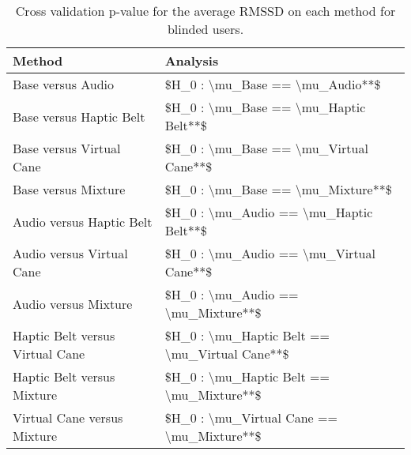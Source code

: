 
\begin{table}[!htb]
\centering
\caption{Cross validation p-value for the average RMSSD on each method for blinded users.}
\label{tab:lsd_average_RMSSD}
\begin{tabular}{ll}
\toprule
                         Method &                                      Analysis \\
\midrule
              Base versus Audio &               \$H\_0 : \textbackslash mu\_Base == \textbackslash mu\_Audio**\$ \\
        Base versus Haptic Belt &         \$H\_0 : \textbackslash mu\_Base == \textbackslash mu\_Haptic Belt**\$ \\
       Base versus Virtual Cane &        \$H\_0 : \textbackslash mu\_Base == \textbackslash mu\_Virtual Cane**\$ \\
            Base versus Mixture &             \$H\_0 : \textbackslash mu\_Base == \textbackslash mu\_Mixture**\$ \\
       Audio versus Haptic Belt &        \$H\_0 : \textbackslash mu\_Audio == \textbackslash mu\_Haptic Belt**\$ \\
      Audio versus Virtual Cane &       \$H\_0 : \textbackslash mu\_Audio == \textbackslash mu\_Virtual Cane**\$ \\
           Audio versus Mixture &            \$H\_0 : \textbackslash mu\_Audio == \textbackslash mu\_Mixture**\$ \\
Haptic Belt versus Virtual Cane & \$H\_0 : \textbackslash mu\_Haptic Belt == \textbackslash mu\_Virtual Cane**\$ \\
     Haptic Belt versus Mixture &      \$H\_0 : \textbackslash mu\_Haptic Belt == \textbackslash mu\_Mixture**\$ \\
    Virtual Cane versus Mixture &     \$H\_0 : \textbackslash mu\_Virtual Cane == \textbackslash mu\_Mixture**\$ \\
\bottomrule
\end{tabular}
\end{table}

